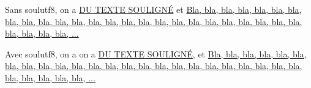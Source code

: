\documentclass[a4paper,10pt]{article}
\begin{document}
Sans soulutf8, on a \underline{DU TEXTE SOULIGNÉ} et
\underline{Bla, bla, bla, bla, bla, bla, bla, bla, bla, bla, bla, bla, bla, bla, bla, bla, bla, bla, bla, bla, bla, bla, bla, bla, bla, bla, bla, bla, bla, ...}

Avec soulutf8, on a  on a \ul{DU TEXTE SOULIGNÉ}, et
\ul{Bla, bla, bla, bla, bla, bla, bla, bla, bla, bla, bla, bla, bla, bla, bla, bla, bla, bla, bla, bla, bla, bla, bla, bla, bla, bla, bla, bla, bla, ...}
\end{document}
